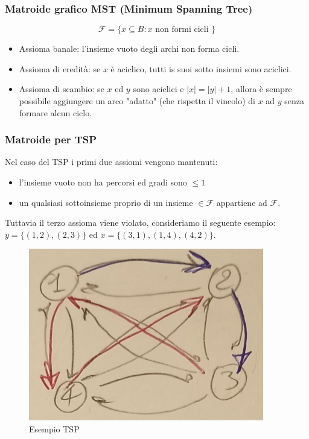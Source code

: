 \documentclass{article}
\begin{document}
    \subsubsection{Matroide grafico MST (Minimum Spanning Tree)}
    $$\mathcal{F}=\{x\subseteq B:x\text{ non formi cicli }\}$$
    \begin{itemize}
        \item Assioma banale: l'insieme vuoto degli archi non forma cicli.
        \item Assioma di eredità: se $x$ è aciclico, tutti is suoi sotto insiemi sono aciclici.
        \item Assioma di scambio: se $x$ ed $y$ sono aciclici e $|x|= |y|+1$, allora è sempre
              possibile aggiungere un arco "adatto" (che rispetta il vincolo) di $x$ ad $y$ senza
              formare alcun ciclo.
    \end{itemize}
    \subsubsection{Matroide per TSP}
    Nel caso del TSP i primi due assiomi vengono mantenuti:
    \begin{itemize}
        \item l'insieme vuoto non ha percorsi ed gradi sono $\leq 1$
        \item un qualsiasi sottoinsieme proprio di un insieme $\in\mathcal{F}$ appartiene ad $\mathcal{F}$.
    \end{itemize}
    Tuttavia il terzo assioma viene violato, consideriamo il seguente esempio: $y=\{(1,2),(2,3)\}$ ed $x=\{(3,1),(1,4),(4,2)\}$.
    \begin{figure}
        \centering
        \includegraphics[scale=0.5]{images/matroid_tsp.png}
        \caption{Esempio TSP}
    \end{figure}
\end{document}
